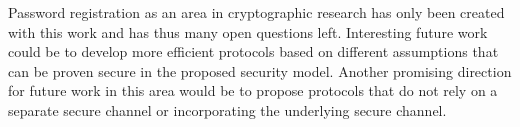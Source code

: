 Password registration as an area in cryptographic research has only been created with this work and has thus many open questions left.
Interesting future work could be to develop more efficient protocols based on different assumptions that can be proven secure in the proposed security model.
Another promising direction for future work in this area would be to propose protocols that do not rely on a separate secure channel or incorporating the underlying secure channel.
